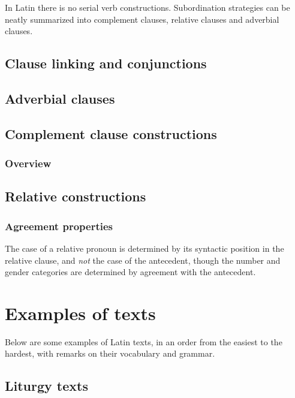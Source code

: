 \documentclass[a4paper, oneside]{report}
\begin{document}
In Latin there is no serial verb constructions.
Subordination strategies can be neatly summarized into 
complement clauses, relative clauses and adverbial clauses.

\section{Clause linking and conjunctions}

\section{Adverbial clauses}



\section{Complement clause constructions}\label{sec:complement-clause-construct}

\subsection{Overview}\label{sec:complement-clause-construct-overview}

\section{Relative constructions}\label{sec:relative-clause}

\subsection{Agreement properties}\label{sec:relative-clause.overview.agreement}

The case of a relative pronoun is determined 
by its syntactic position in the relative clause, 
and \emph{not} the case of the antecedent,
though the number and gender categories 
are determined by agreement with the antecedent.

\chapter{Examples of texts}

Below are some examples of Latin texts, 
in an order from the easiest to the hardest,
with remarks on their vocabulary and grammar. 

\section{Liturgy texts}
\end{document}
